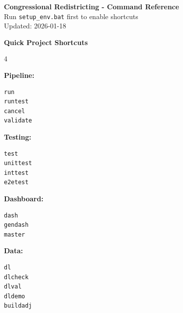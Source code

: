 \documentclass[10pt,landscape]{article}
\begin{document}
\begin{center}
\textbf{\LARGE Congressional Redistricting - Command Reference}\\
\vspace{4pt}
\large Run \texttt{setup\_env.bat} first to enable shortcuts\\
\vspace{2pt}
\normalsize Updated: 2026-01-18
\end{center}

\vspace{6pt}

\begin{tcolorbox}[colback=highlightbg,colframe=sectioncolor,boxrule=1pt,arc=2pt,left=6pt,right=6pt,top=4pt,bottom=4pt]
\textbf{\large Quick Project Shortcuts}

\vspace{4pt}

\begin{multicols}{4}
\raggedright

\textbf{Pipeline:}
\begin{Verbatim}[fontsize=\normalsize,frame=none]
run
runtest
cancel
validate
\end{Verbatim}

\columnbreak

\textbf{Testing:}
\begin{Verbatim}[fontsize=\normalsize,frame=none]
test
unittest
inttest
e2etest
\end{Verbatim}

\columnbreak

\textbf{Dashboard:}
\begin{Verbatim}[fontsize=\normalsize,frame=none]
dash
gendash
master
\end{Verbatim}

\columnbreak

\textbf{Data:}
\begin{Verbatim}[fontsize=\normalsize,frame=none]
dl
dlcheck
dlval
dldemo
buildadj
\end{Verbatim}

\end{multicols}
\end{tcolorbox}

\vspace{4pt}
\end{document}
